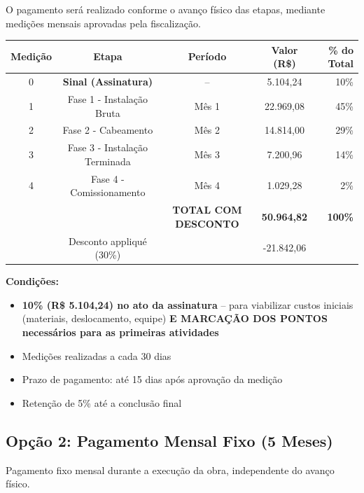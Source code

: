 \documentclass[12pt,a4paper]{article}
\renewenvironment{table}%
{\begin{center}%
\scriptsize%
\addtolength{\tabcolsep}{-2pt}%
}%
{\end{center}}
\begin{document}
O pagamento será realizado conforme o avanço físico das etapas, mediante medições mensais aprovadas pela fiscalização.

\begin{table}
\centering
\begin{tabular}{ccccr}
\toprule
\textbf{Medição} & \textbf{Etapa} & \textbf{Período} & \textbf{Valor (R\$)} & \textbf{\% do Total} \\
\midrule
0 & \textbf{Sinal (Assinatura)} & -- & 5.104,24 & 10\% \\
1 & Fase 1 - Instalação Bruta & Mês 1 & 22.969,08 & 45\% \\
2 & Fase 2 - Cabeamento & Mês 2 & 14.814,00 & 29\% \\
3 & Fase 3 - Instalação Terminada & Mês 3 & 7.200,96 & 14\% \\
4 & Fase 4 - Comissionamento & Mês 4 & 1.029,28 & 2\% \\
\midrule
 & & \textbf{TOTAL COM DESCONTO} & \textbf{50.964,82} & \textbf{100\%} \\
 & Desconto appliqué (30\%) & & -21.842,06 & \\
\bottomrule
\end{tabular}
\end{table}

\noindent\textbf{Condições:}
\begin{itemize}
\item \textbf{10\% (R\$ 5.104,24) no ato da assinatura} -- para viabilizar custos iniciais (materiais, deslocamento, equipe) \textbf{E MARCAÇÃO DOS PONTOS necessários para as primeiras atividades}
\item Medições realizadas a cada 30 dias
\item Prazo de pagamento: até 15 dias após aprovação da medição
\item Retenção de 5\% até a conclusão final
\end{itemize}

\pagebreak

\subsection{Opção 2: Pagamento Mensal Fixo (5 Meses)}

Pagamento fixo mensal durante a execução da obra, independente do avanço físico.
\end{document}
